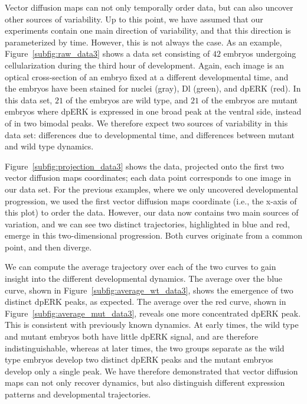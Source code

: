 \documentclass{pnastwo}
\begin{document}
\begin{article}
Vector diffusion maps can not only temporally order data, but can also uncover other sources of variability.
%
Up to this point, we have assumed that our experiments contain one main direction of variability, and that this direction is parameterized by time.
%
However, this is not always the case.
%
As an example, Figure~\ref{subfig:raw_data3} shows a data set consisting of $42$ embryos undergoing cellularization during the third hour of development. 
%
Again, each image is an optical cross-section of an embryo fixed at a different developmental time, and the embryos have been stained for nuclei (gray), Dl (green), and dpERK (red).
%
In this data set, $21$ of the embryos are wild type, and $21$ of the embryos are mutant embryos where dpERK is expressed in one broad peak at the ventral side, instead of in two bimodal peaks.
%
We therefore expect two sources of variability in this data set: differences due to developmental time, and differences between mutant and wild type dynamics.





Figure~\ref{subfig:projection_data3} shows the data, projected onto the first two vector diffusion maps coordinates;
each data point corresponds to one image in our data set.
%
For the previous examples, where we only uncovered developmental progression, we used the first vector diffusion maps coordinate (i.e., the x-axis of this plot) to order the data. 
%
However, our data now contains two main sources of variation, and we can see two distinct trajectories, highlighted in blue and red, emerge in this two-dimensional progression.
%
Both curves originate from a common point, and then diverge. 

We can compute the average trajectory over each of the two curves to gain insight into the different developmental dynamics.
%
The average over the blue curve, shown in Figure~\ref{subfig:average_wt_data3}, shows the emergence of two distinct dpERK peaks, as expected.
%
The average over the red curve, shown in Figure~\ref{subfig:average_mut_data3}, reveals one more concentrated dpERK peak.
%
This is consistent with previously known dynamics.
%
At early times, the wild type and mutant embryos both have little dpERK signal, and are therefore indistinguishable, whereas at later times, the two groups separate as the wild type embryos develop two distinct dpERK peaks and the mutant embryos develop only a single peak.
%
We have therefore demonstrated that vector diffusion maps can not only recover dynamics, but also distinguish different expression patterns and developmental trajectories.


\end{article}
\end{document}
